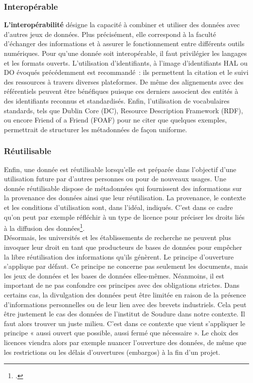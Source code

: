             \subsubsection{Interopérable}

\textbf{L’interopérabilité} désigne la capacité à combiner et utiliser des données avec d’autres jeux de données. Plus précisément, elle correspond à la faculté d'échanger des informations et à assurer le fonctionnement entre différents outils numériques. Pour qu’une donnée soit interopérable, il faut privilégier les langages et les formats ouverts. L’utilisation d’identifiants, à l’image d’identifiants HAL ou DO évoqués précédemment est recommandé : ils permettent la citation et le suivi des ressources à travers diverses plateformes. De même des alignements avec des référentiels peuvent être bénéfiques puisque ces derniers associent des entités à des identifiants reconnus et standardisés. Enfin, l’utilisation de vocabulaires standards, tels que Dublin Core (DC), Resource Description Framework (RDF), ou encore Friend of a Friend (FOAF) pour ne citer que quelques exemples, permettrait de structurer les métadonnées de façon uniforme.
            
            \subsubsection{Réutilisable}

Enfin, une donnée est réutilisable lorsqu’elle est préparée dans l’objectif d’une utilisation future par d’autres personnes ou pour de nouveaux usages. Une donnée réutilisable dispose de métadonnées qui fournissent des informations sur la provenance des données ainsi que leur réutilisation. La provenance, le contexte et les conditions d’utilisation sont, dans l’idéal, indiqués. C’est dans ce cadre qu’on peut par exemple réfléchir à un type de licence pour préciser les droits liés à la diffusion des données\footcite{PrincipesFAIR}.\\ 

Désormais, les universités et les établissements de recherche ne peuvent plus invoquer leur droit en tant que producteurs de bases de données pour empêcher la libre réutilisation des informations qu'ils génèrent. Le principe d’ouverture s’applique par défaut. Ce principe ne concerne pas seulement les documents, mais les jeux de données et les bases de données elles-mêmes. Néanmoins, il est important de ne pas confondre ces principes avec des obligations strictes. Dans certains cas, la divulgation des données peut être limitée en raison de la présence d'informations personnelles ou de leur lien avec des brevets industriels. Cela peut être justement le cas des données de l’institut de Soudure dans notre contexte. Il faut alors trouver un juste milieu. C’est dans ce contexte que vient s’appliquer le principe « aussi ouvert que possible, aussi fermé que nécessaire ». Le choix des licences viendra alors par exemple nuancer l’ouverture des données, de même que les restrictions ou les délais d’ouvertures (embargos) à la fin d’un projet.\\

